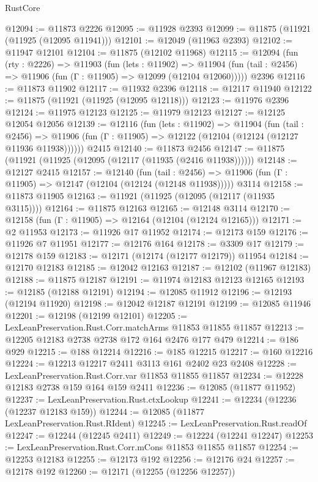 \begin{lexlean}{RustCore}
\begin{coremodule}
@12094 := @11873 @2226
@12095 := @11928 @2393
@12099 := @11875 (@11921 (@11925 (@12095 @11941)))
@12101 := @12049 (@11963 @2393)
@12102 := @11947 @12101
@12104 := @11875 (@12102 @11968)
@12115 := @12094
    (fun (rty : @2226) =>
    @11903
      (fun (lets : @11902) =>
      @11904 (fun (tail : @2456) => @11906 (fun (Γ : @11905) => @12099 (@12104 @12060)))))
    @2396
@12116 := @11873 @11902
@12117 := @11932 @2396
@12118 := @12117 @11940
@12122 := @11875 (@11921 (@11925 (@12095 @12118)))
@12123 := @11976 @2396
@12124 := @11975 @12123
@12125 := @11979 @12123
@12127 := @12125 @12054 @12056
@12139 := @12116
    (fun (lets : @11902) =>
    @11904
      (fun (tail : @2456) =>
      @11906 (fun (Γ : @11905) => @12122 (@12104 (@12124 (@12127 @11936 @11938))))))
    @2415
@12140 := @11873 @2456
@12147 := @11875 (@11921 (@11925 (@12095 (@12117 (@11935 (@2416 @11938))))))
@12148 := @12127 @2415
@12157 := @12140
    (fun (tail : @2456) => @11906 (fun (Γ : @11905) => @12147 (@12104 (@12124 (@12148 @11938)))))
    @3114
@12158 := @11873 @11905
@12163 := @11921 (@11925 (@12095 (@12117 (@11935 @3115))))
@12164 := @11875 @12163
@12165 := @12148 @3114
@12170 := @12158 (fun (Γ : @11905) => @12164 (@12104 (@12124 @12165)))
@12171 := @2 @11953
@12173 := @11926 @17 @11952
@12174 := @12173 @159
@12176 := @11926 @7 @11951
@12177 := @12176 @164
@12178 := @3309 @17
@12179 := @12178 @159
@12183 := @12171 (@12174 (@12177 @12179)) @11954
@12184 := @12170 @12183
@12185 := @12042 @12163
@12187 := @12102 (@11967 @12183)
@12188 := @11875 @12187
@12191 := @11974 @12183 @12123 @12165
@12193 := @12185 (@12188 @12191)
@12194 := @12085 @11912
@12196 := @12193 (@12194 @11920)
@12198 := @12042 @12187 @12191
@12199 := @12085 @11946
@12201 := @12198 (@12199 @12101)
@12205 := LexLeanPreservation.Rust.Corr.matchArms @11853 @11855 @11857
@12213 := @12205 @12183 @2738 @2738 @172 @164 @2476 @177 @479
@12214 := @186 @929
@12215 := @188 @12214
@12216 := @185 @12215
@12217 := @160 @12216
@12224 := @12213 @12217 @2411 @3113 @161 @2402 @23 @2408
@12228 := LexLeanPreservation.Rust.Corr.var @11853 @11855 @11857
@12234 := @12228 @12183 @2738 @159 @164 @159 @2411
@12236 := @12085 (@11877 @11952)
@12237 := LexLeanPreservation.Rust.ctxLookup
@12241 := @12234 (@12236 (@12237 @12183 @159))
@12244 := @12085 (@11877 LexLeanPreservation.Rust.RIdent)
@12245 := LexLeanPreservation.Rust.readOf
@12247 := @12244 (@12245 @2411)
@12249 := @12224 (@12241 @12247)
@12253 := LexLeanPreservation.Rust.Corr.mCons @11853 @11855 @11857
@12254 := @12253 @12183
@12255 := @12173 @192
@12256 := @12176 @24
@12257 := @12178 @192
@12260 := @12171 (@12255 (@12256 @12257))

\end{coremodule}
\end{lexlean}
